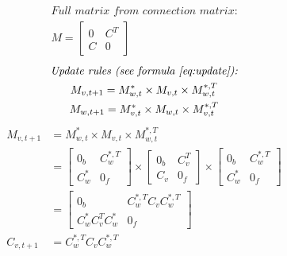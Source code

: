 \documentclass{article}
\begin{document}
\begin{equation}
\begin{gathered}
    \textit{Full matrix from connection matrix:} \\
    M = \begin{bmatrix}
            0 & C^T \\
            C & 0
        \end{bmatrix} 
\end{gathered}
\end{equation}
\begin{equation}
\begin{gathered}
    \textit{Update rules (see formula~\ref{eq:update}):} \\
    M_{v, t+1} = M^*_{w, t} \times M_{v, t} \times M^{*,T}_{w, t} \\
    M_{w, t+1} = M^*_{v, t} \times M_{w, t} \times M^{*,T}_{v, t}
\end{gathered}
\end{equation}
\begin{equation}
\begin{aligned}
    M_{v, t+1} &= M^*_{w, t} \times M_{v, t} \times M^{*,T}_{w, t} \\
               &= \begin{bmatrix}
                   0_b & C^{*,T}_w \\
                   C^*_w & 0_f
               \end{bmatrix} \times 
               \begin{bmatrix}
                   0_b & C^T_v \\
                   C_v & 0_f
               \end{bmatrix} \times
               \begin{bmatrix} 
                   0_b & C^{*,T}_w \\
                   C^*_w & 0_f
               \end{bmatrix} \\
               &= \begin{bmatrix}
                   0_b & C^{*,T}_w C_v C^{*,T}_w \\
                   C^*_w C^T_v C^*_w & 0_f
                   \end{bmatrix} \\
     C_{v,t+1} &= C^{*,T}_w C_v C^{*,T}_w
\end{aligned}
\end{equation}
\end{document}

